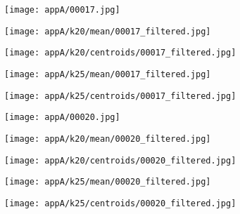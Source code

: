 \documentclass[draft,final]{vutinfth} %
\begin{document}
\begin{appendices}
\begin{figure}[h]
\centering
  \begin{subfigure}[b]{0.19\columnwidth}
    \centering
    \texttt{[image: appA/00017.jpg]}
  \end{subfigure}
  \begin{subfigure}[b]{0.19\columnwidth}
    \centering
    \texttt{[image: appA/k20/mean/00017\_filtered.jpg]}
  \end{subfigure}
  \begin{subfigure}[b]{0.19\columnwidth}
    \centering
    \texttt{[image: appA/k20/centroids/00017\_filtered.jpg]}
  \end{subfigure}
  \begin{subfigure}[b]{0.19\columnwidth}
    \centering
    \texttt{[image: appA/k25/mean/00017\_filtered.jpg]}
  \end{subfigure}
  \begin{subfigure}[b]{0.19\columnwidth}
    \centering
    \texttt{[image: appA/k25/centroids/00017\_filtered.jpg]}
  \end{subfigure}
\caption{}
\end{figure}  

\begin{figure}[h]
\centering
  \begin{subfigure}[b]{0.19\columnwidth}
    \centering
    \texttt{[image: appA/00020.jpg]}
  \end{subfigure}
  \begin{subfigure}[b]{0.19\columnwidth}
    \centering
    \texttt{[image: appA/k20/mean/00020\_filtered.jpg]}
  \end{subfigure}
  \begin{subfigure}[b]{0.19\columnwidth}
    \centering
    \texttt{[image: appA/k20/centroids/00020\_filtered.jpg]}
  \end{subfigure}
  \begin{subfigure}[b]{0.19\columnwidth}
    \centering
    \texttt{[image: appA/k25/mean/00020\_filtered.jpg]}
  \end{subfigure}
  \begin{subfigure}[b]{0.19\columnwidth}
    \centering
    \texttt{[image: appA/k25/centroids/00020\_filtered.jpg]}
  \end{subfigure}
\caption{}
\end{figure}  


\end{appendices}
\end{document}
